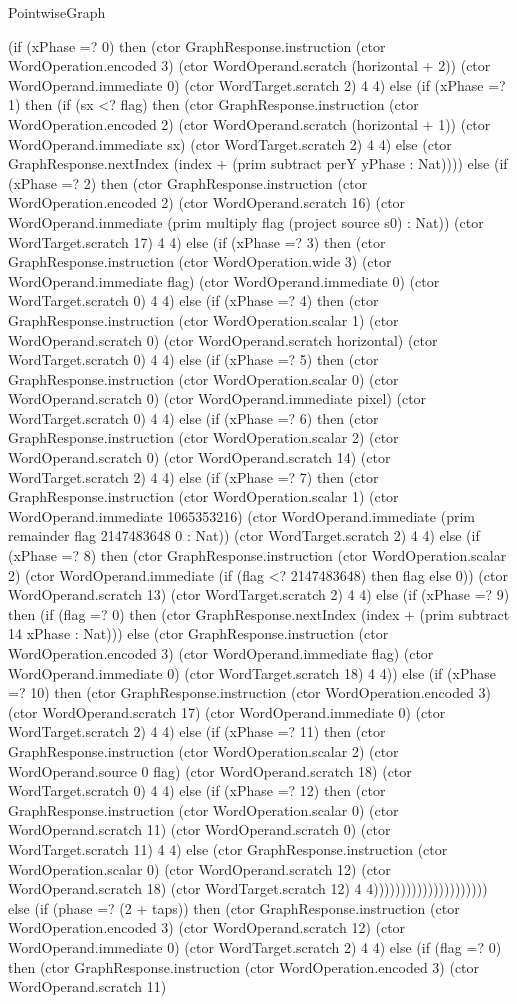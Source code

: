 \begin{lexlean}{PointwiseGraph}
\begin{semanticmodule}
{      (if (xPhase =? 0) then (ctor GraphResponse.instruction (ctor WordOperation.encoded 3) (ctor WordOperand.scratch (horizontal + 2)) (ctor WordOperand.immediate 0) (ctor WordTarget.scratch 2) 4 4) else (if (xPhase =? 1) then (if (sx <? flag) then (ctor GraphResponse.instruction (ctor WordOperation.encoded 2) (ctor WordOperand.scratch (horizontal + 1)) (ctor WordOperand.immediate sx) (ctor WordTarget.scratch 2) 4 4) else (ctor GraphResponse.nextIndex (index + (prim subtract perY yPhase : Nat)))) else (if (xPhase =? 2) then (ctor GraphResponse.instruction (ctor WordOperation.encoded 2) (ctor WordOperand.scratch 16) (ctor WordOperand.immediate (prim multiply flag (project source s0) : Nat)) (ctor WordTarget.scratch 17) 4 4) else (if (xPhase =? 3) then (ctor GraphResponse.instruction (ctor WordOperation.wide 3) (ctor WordOperand.immediate flag) (ctor WordOperand.immediate 0) (ctor WordTarget.scratch 0) 4 4) else (if (xPhase =? 4) then (ctor GraphResponse.instruction (ctor WordOperation.scalar 1) (ctor WordOperand.scratch 0) (ctor WordOperand.scratch horizontal) (ctor WordTarget.scratch 0) 4 4) else (if (xPhase =? 5) then (ctor GraphResponse.instruction (ctor WordOperation.scalar 0) (ctor WordOperand.scratch 0) (ctor WordOperand.immediate pixel) (ctor WordTarget.scratch 0) 4 4) else (if (xPhase =? 6) then (ctor GraphResponse.instruction (ctor WordOperation.scalar 2) (ctor WordOperand.scratch 0) (ctor WordOperand.scratch 14) (ctor WordTarget.scratch 2) 4 4) else (if (xPhase =? 7) then (ctor GraphResponse.instruction (ctor WordOperation.scalar 1) (ctor WordOperand.immediate 1065353216) (ctor WordOperand.immediate (prim remainder flag 2147483648 0 : Nat)) (ctor WordTarget.scratch 2) 4 4) else (if (xPhase =? 8) then (ctor GraphResponse.instruction (ctor WordOperation.scalar 2) (ctor WordOperand.immediate (if (flag <? 2147483648) then flag else 0)) (ctor WordOperand.scratch 13) (ctor WordTarget.scratch 2) 4 4) else (if (xPhase =? 9) then (if (flag =? 0) then (ctor GraphResponse.nextIndex (index + (prim subtract 14 xPhase : Nat))) else (ctor GraphResponse.instruction (ctor WordOperation.encoded 3) (ctor WordOperand.immediate flag) (ctor WordOperand.immediate 0) (ctor WordTarget.scratch 18) 4 4)) else (if (xPhase =? 10) then (ctor GraphResponse.instruction (ctor WordOperation.encoded 3) (ctor WordOperand.scratch 17) (ctor WordOperand.immediate 0) (ctor WordTarget.scratch 2) 4 4) else (if (xPhase =? 11) then (ctor GraphResponse.instruction (ctor WordOperation.scalar 2) (ctor WordOperand.source 0 flag) (ctor WordOperand.scratch 18) (ctor WordTarget.scratch 0) 4 4) else (if (xPhase =? 12) then (ctor GraphResponse.instruction (ctor WordOperation.scalar 0) (ctor WordOperand.scratch 11) (ctor WordOperand.scratch 0) (ctor WordTarget.scratch 11) 4 4) else (ctor GraphResponse.instruction (ctor WordOperation.scalar 0) (ctor WordOperand.scratch 12) (ctor WordOperand.scratch 18) (ctor WordTarget.scratch 12) 4 4))))))))))))))))))))) else (if (phase =? (2 + taps)) then (ctor GraphResponse.instruction (ctor WordOperation.encoded 3) (ctor WordOperand.scratch 12) (ctor WordOperand.immediate 0) (ctor WordTarget.scratch 2) 4 4) else (if (flag =? 0) then (ctor GraphResponse.instruction (ctor WordOperation.encoded 3) (ctor WordOperand.scratch 11) }
\end{semanticmodule}
\end{lexlean}
